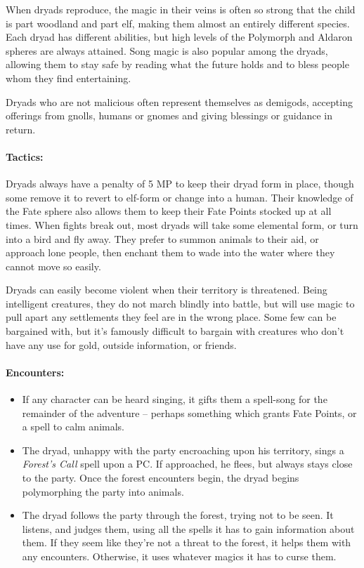 \begin{multicols}{2}
When dryads reproduce, the magic in their veins is often so strong that the child is part woodland and part elf, making them almost an entirely different species.
Each dryad has different abilities, but high levels of the Polymorph and Aldaron spheres are always attained.
Song magic is also popular among the dryads, allowing them to stay safe by reading what the future holds and to bless people whom they find entertaining.

Dryads who are not malicious often represent themselves as demigods, accepting offerings from gnolls, humans or gnomes and giving blessings or guidance in return.

\dryad

\paragraph{Tactics:}
Dryads always have a penalty of 5 MP to keep their dryad form in place, though some remove it to revert to elf-form or change into a human.
Their knowledge of the Fate sphere also allows them to keep their Fate Points stocked up at all times.
When fights break out, most dryads will take some elemental form, or turn into a bird and fly away.
They prefer to summon animals to their aid, or approach lone people, then enchant them to wade into the water where they cannot move so easily.

Dryads can easily become violent when their territory is threatened.
Being intelligent creatures, they do not march blindly into battle, but will use magic to pull apart any settlements they feel are in the wrong place.
Some few can be bargained with, but it's famously difficult to bargain with creatures who don't have any use for gold, outside information, or friends.

\paragraph{Encounters:}

\begin{itemize}

  \item
  If any character can be heard singing, it gifts them a spell-song for the remainder of the adventure -- perhaps something which grants Fate Points, or a spell to calm animals.
  \item
  The dryad, unhappy with the party encroaching upon his territory, sings a \textit{Forest's Call} spell upon a PC.%
  \iftoggle{core}{
  \footnote{\nameref{forestsCall}.  Core rules, page \pageref{forestsCall}.}%
  }{}
  If approached, he flees, but always stays close to the party.
  Once the forest encounters begin, the dryad begins polymorphing the party into animals.
  \item
  The dryad follows the party through the forest, trying not to be seen.
  It listens, and judges them, using all the spells it has to gain information about them.
  If they seem like they're not a threat to the forest, it helps them with any encounters.
  Otherwise, it uses whatever magics it has to curse them.


\end{itemize}
\end{multicols}
